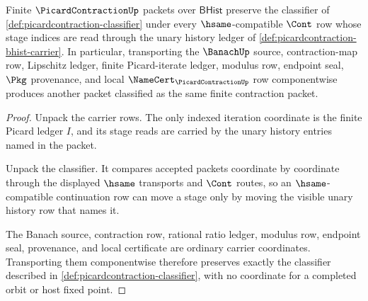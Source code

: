 \begin{theorem}
\label{thm:picardcontraction-classifier-stability}
Finite $\PicardContractionUp$ packets over $\mathsf{BHist}$ preserve the classifier of \autoref{def:picardcontraction-classifier} under every $\hsame$-compatible $\Cont$ row whose stage indices are read through the unary history ledger of \autoref{def:picardcontraction-bhist-carrier}. In particular, transporting the $\BanachUp$ source, contraction-map row, Lipschitz ledger, finite Picard-iterate ledger, modulus row, endpoint seal, $\Pkg$ provenance, and local $\NameCert_{\PicardContractionUp}$ row componentwise produces another packet classified as the same finite contraction packet.
\end{theorem}
\begin{proof}
Unpack the carrier rows. The only indexed iteration coordinate is the finite Picard ledger $I$, and its stage reads are carried by the unary history entries named in the packet.

Unpack the classifier. It compares accepted packets coordinate by coordinate through the displayed $\hsame$ transports and $\Cont$ routes, so an $\hsame$-compatible continuation row can move a stage only by moving the visible unary history row that names it.

The Banach source, contraction row, rational ratio ledger, modulus row, endpoint seal, provenance, and local certificate are ordinary carrier coordinates. Transporting them componentwise therefore preserves exactly the classifier described in \autoref{def:picardcontraction-classifier}, with no coordinate for a completed orbit or host fixed point.
\end{proof}

